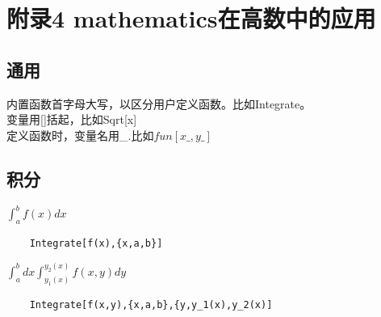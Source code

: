 \documentclass[fleqn]{article}
\begin{document}
\section{附录4 mathematics在高数中的应用}

\subsection{通用}

内置函数首字母大写，以区分用户定义函数。比如Integrate。\\
变量用[]括起，比如Sqrt[x]\\
定义函数时，变量名用\_.比如$fun[x\_,y\_]$\\

\subsection{积分}
$\int_a^b f(x)dx$
\begin{verbatim}
	Integrate[f(x),{x,a,b}]
\end{verbatim}
$\int_a^b dx\int_{y_1(x)}^{y_2(x)}f(x,y)dy$
\begin{verbatim}
	Integrate[f(x,y),{x,a,b},{y,y_1(x),y_2(x)]
\end{verbatim}
\end{document}
